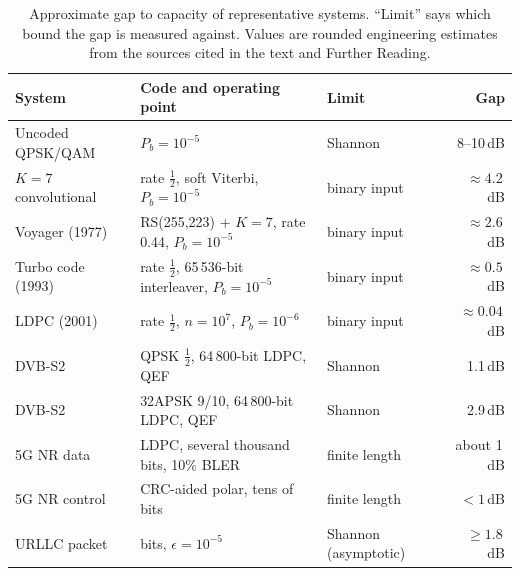 \begin{table}[htbp]\centering\small
\caption{Approximate gap to capacity of representative systems. ``Limit'' says which bound the gap
is measured against. Values are rounded engineering estimates from the sources cited in the text and
Further Reading.}
\label{tab:ch13:gaps}
\begin{tabularx}{\linewidth}{@{}l>{\raggedright\arraybackslash}Xlr@{}}
\toprule
System & Code and operating point & Limit & Gap \\
\midrule
Uncoded QPSK/QAM & $P_b=10^{-5}$ & Shannon & 8--10\,dB \\
$K=7$ convolutional & rate $\frac12$, soft Viterbi, $P_b=10^{-5}$ & binary input & $\approx4.2$\,dB \\
Voyager (1977) & RS(255,223) + $K=7$, rate 0.44, $P_b=10^{-5}$ & binary input & $\approx2.6$\,dB \\
Turbo code (1993) & rate $\frac12$, 65\,536-bit interleaver, $P_b=10^{-5}$ & binary input & $\approx0.5$\,dB \\
LDPC (2001) & rate $\frac12$, $n=10^7$, $P_b=10^{-6}$ & binary input & $\approx0.04$\,dB \\
DVB-S2 & QPSK $\frac12$, 64\,800-bit LDPC, QEF & Shannon & 1.1\,dB \\
DVB-S2 & 32APSK 9/10, 64\,800-bit LDPC, QEF & Shannon & 2.9\,dB \\
5G NR data & LDPC, several thousand bits, 10\% BLER & finite length & about 1\,dB \\
5G NR control & CRC-aided polar, tens of bits & finite length & $<1$\,dB \\
URLLC packet & 256 bits, $\epsilon=10^{-5}$ & Shannon (asymptotic) & $\ge1.8$\,dB \\
\bottomrule
\end{tabularx}
\end{table}


